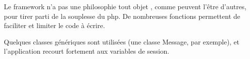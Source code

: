 Le framework n'a pas une philosophie \og tout objet \fg{}, comme peuvent l'être d'autres, pour tirer parti de la souplesse du php. De nombreuses fonctions permettent de faciliter et limiter le code à écrire.

Quelques classes génériques sont utilisées (une classe Message, par exemple), et l'application recourt fortement aux variables de session. 
